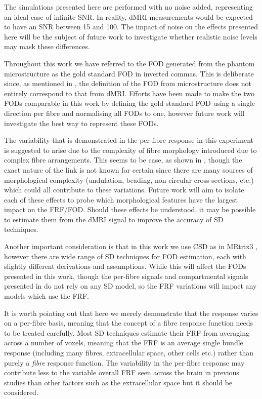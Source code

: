 The simulations presented here are performed with no noise added, representing an ideal case of infinite \ac{SNR}. In reality, \ac{dMRI} measurements would be expected to have an \ac{SNR} between 15 and 100. The impact of noise on the effects presented here will be the subject of future work to investigate whether realistic noise levels may mask these differences.

Throughout this work we have referred to the \ac{FOD} generated from the phantom microstructure as the gold standard \ac{FOD} in inverted commas. This is deliberate since, as mentioned in , the definition of the \ac{FOD} from microstructure does not entirely correspond to that from \ac{dMRI}.
Efforts have been made to make the two \acp{FOD} comparable in this work by defining the gold standard \ac{FOD} using a single direction per fibre and normalising all \acp{FOD} to one, however future work will investigate the best way to represent these \acp{FOD}.

The variability that is demonstrated in the per-fibre response in this experiment is suggested to arise due to the complexity of fibre morphology introduced due to complex fibre arrangements.
This seems to be case, as shown in , though the exact nature of the link is not known for certain since there are many sources of morphological complexity (undulation, beading, non-circular cross-sections, etc.) which could all contribute to these variations.
Future work will aim to isolate each of these effects to probe which morphological features have the largest impact on the \ac{FRF}/\ac{FOD}. Should these effects be understood, it may be possible to estimate them from the \ac{dMRI} signal to improve the accuracy of \ac{SD} techniques.

Another important consideration is that in this work we use \acl{CSD} as in MRtrix3 \cite{Tournier2019}, however there are wide range of \ac{SD} techniques for \ac{FOD} estimation, each with slightly different derivations and assumptions.
While this will affect the \acp{FOD} presented in this work, though the per-fibre signals and compartmental signals presented in  do not rely on any \ac{SD} model, so the \ac{FRF} variations will impact any models which use the \ac{FRF}.

It is worth pointing out that here we merely demonstrate that the response varies on a per-fibre basis, meaning that the concept of a fibre response function needs to be treated carefully. Most \ac{SD} techniques estimate their \ac{FRF} from averaging across a number of voxels, meaning that the \ac{FRF} is an average single bundle response (including many fibres, extracellular space, other cells etc.) rather than purely a \emph{fibre} response function.
The variability in the per-fibre response may contribute less to the variable overall \ac{FRF} seen across the brain in previous studies \cite{Schilling2019,Christiaens2020} than other factors such as the extracellular space but it should be considered. 


